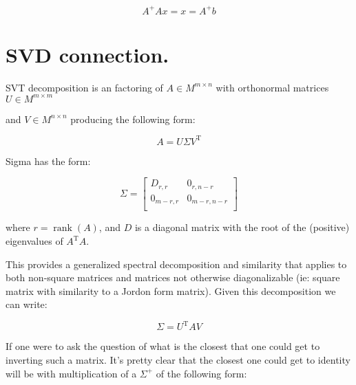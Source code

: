 \documentclass{article}      %
\newcommand{\T}[0]{\text{T}}
\DeclareMathOperator{\rank}{rank}
\begin{document}
\begin{equation}
A^{+} A x = x = A^{+} b
\end{equation}











































\section{ SVD connection. }


SVT decomposition is an factoring of $A \in M^{m \times n}$ with orthonormal matrices $U \in M^{m \times m}$

and $V \in M^{n \times n} $ producing the following form:

\[
A = U \Sigma V^\T
\]

Sigma has the form:

\[
\Sigma = 
\begin{bmatrix}
D_{r,r} & 0_{r,n-r} \\
0_{m-r,r} & 0_{m-r,n-r} \\
\end{bmatrix}
\]

where $r = \rank(A)$, and $D$ is a diagonal matrix with the root of the (positive) eigenvalues of $A^\T A$.

This provides a generalized spectral decomposition and similarity that applies to both non-square matrices and matrices not otherwise diagonalizable
(ie: square matrix with similarity to a Jordon form matrix).  Given this decomposition we can write:

\[
\Sigma = U^\T A V
\]

If one were to ask the question of what is the closest that one could get to inverting such a matrix.  It's pretty clear that the closest one could get to
identity will be with multiplication of a $\Sigma^{+}$ of the following form:
\end{document}
